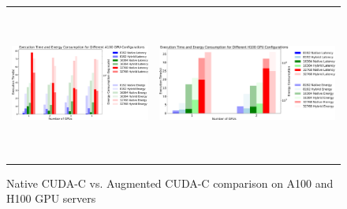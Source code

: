 \begin{figure}[htbp]
\centering
\begin{tabular}{cc}
    \begin{minipage}{0.45\linewidth}
        \centering
        \includegraphics[width=\linewidth, height=5cm]{Images/a100-crop.pdf}
        
    \end{minipage} &
    \begin{minipage}{0.45\linewidth}
        \centering
        \includegraphics[width=\linewidth, height=5cm]{Images/h100-crop.pdf}
    \end{minipage} \\
\end{tabular}
\caption{Native CUDA-C vs. Augmented CUDA-C comparison on A100 and H100 GPU servers}
\label{fig:A100_H100_nat_vs_aug}
\end{figure}
